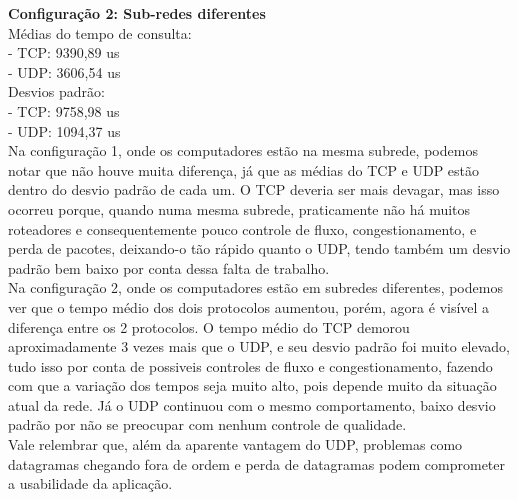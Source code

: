 \documentclass[11pt,twoside]{article}
\begin{document}
\textbf{Configuração 2: Sub-redes diferentes}\\
Médias do tempo de consulta:\\
- TCP: 9390,89 us\\
- UDP: 3606,54 us\\
Desvios padrão:\\
- TCP: 9758,98 us\\
- UDP: 1094,37 us\\

Na configuração 1, onde os computadores estão na mesma subrede, podemos notar que não houve muita diferença, já que as médias do TCP e UDP estão dentro do desvio padrão de cada um. O TCP deveria ser mais devagar, mas isso ocorreu porque, quando numa mesma subrede, praticamente não há muitos roteadores e consequentemente pouco controle de fluxo, congestionamento, e perda de pacotes, deixando-o tão rápido quanto o UDP, tendo também um desvio padrão bem baixo por conta dessa falta de trabalho.\\
Na configuração 2, onde os computadores estão em subredes diferentes, podemos ver que o tempo médio dos dois protocolos aumentou, porém, agora é visível a diferença entre os 2 protocolos. O tempo médio do TCP demorou aproximadamente 3 vezes mais que o UDP, e seu desvio padrão foi muito elevado, tudo isso por conta de possiveis controles de fluxo e congestionamento, fazendo com que a variação dos tempos seja muito alto, pois depende muito da situação atual da rede. Já o UDP continuou com o mesmo comportamento, baixo desvio padrão por não se preocupar com nenhum controle de qualidade.\\
Vale relembrar que, além da aparente vantagem do UDP, problemas como datagramas chegando fora de ordem e perda de datagramas podem comprometer a usabilidade da aplicação.\\
\end{document}
